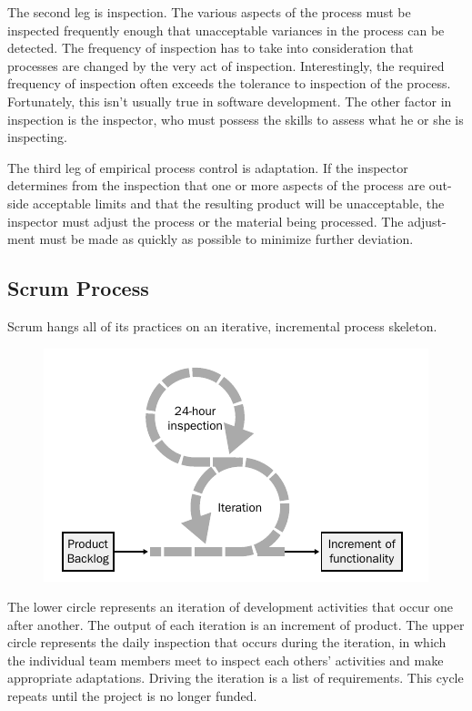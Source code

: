The second leg is inspection. The various aspects of the process must be inspected frequently enough that unacceptable variances in the process can be detected. The frequency of inspection has to take into consideration that processes are changed by the very act of inspection. Interestingly, the required frequency of inspection often exceeds the tolerance to inspection of the process. Fortunately, this isn’t usually true in software development. The other factor in inspection is the inspector, who must possess the skills to assess what he or she is inspecting.

The third leg of empirical process control is adaptation. If the inspector determines from the inspection that one or more aspects of the process are out- side acceptable limits and that the resulting product will be unacceptable, the inspector must adjust the process or the material being processed. The adjust- ment must be made as quickly as possible to minimize further deviation.

\subsection{Scrum Process}

Scrum hangs all of its practices on an iterative, incremental process skeleton.

\begin{figure}[H]
    \centering
    \includegraphics[scale=0.6]{images/2021-09-30_scrum_01.png}
\end{figure}


The lower circle represents an iteration of development activities that occur one after another. The output of each iteration is an increment of product. The upper circle represents the daily inspection that occurs during the iteration, in which the individual team members meet to inspect each others’ activities and make appropriate adaptations. Driving the iteration is a list of requirements. This cycle repeats until the project is no longer funded.

